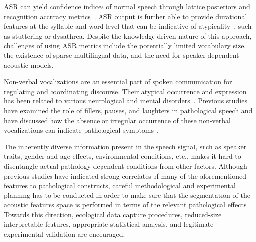 \documentclass{article}
\begin{document}
ASR can yield confidence indices of normal speech through lattice posteriors and recognition accuracy metrics~\cite{kim2015automatic,zlotnik2015random}. 
ASR output is further able to provide durational features at the syllable and word level that can be indicative of atypicality~\cite{an2015automatic}, such as stuttering or dysathrea. 
Despite the knowledge-driven nature of this approach, challenges of using ASR metrics include the potentially limited vocabulary size, the existence of sparse multilingual data, and the need for speaker-dependent acoustic models.

Non-verbal vocalizations are an essential part of spoken communication for regulating and coordinating discourse. Their atypical occurrence and expression has been related to various neurological and mental disorders~\cite{lake2011listener}. Previous studies have examined the role of fillers, pauses, and laughters in pathological speech and have discussed how the absence or irregular occurrence of these non-verbal vocalizations can indicate pathological symptoms~\cite{heeman2010autism,gupta2014predicting}.

The inherently diverse information present in the speech signal, such as speaker traits, gender and age effects, environmental conditions, etc., makes it hard to disentangle actual pathology-dependent conditions from other factors. Although previous studies have indicated strong correlates of many of the aforementioned features to pathological constructs, careful methodological and experimental planning has to be conducted in order to make sure that the segmentation of the acoustic features space is performed in terms of the relevant pathological effects~\cite{bone2013classifying}. Towards this direction, ecological data capture procedures, reduced-size interpretable features, appropriate statistical analysis, and legitimate experimental validation are encouraged.
\end{document}
